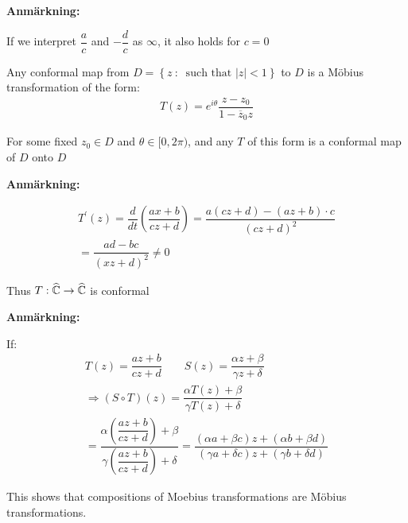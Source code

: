 \par\bigskip
\noindent\textbf{Anmärkning:}\par
\noindent If we interpret $\dfrac{a}{c}$ and $-\dfrac{d}{c}$ as $\infty$, it also holds for $c=0$
\newpage
\begin{theo}[]{}
  Any conformal map from $D = \left\{z\::\:\text{ such that }\left|z\right|<1\right\}$ to $D$ is a Möbius transformation of the form:
  \begin{equation*}
    \begin{gathered}
      T(z) = e^{i\theta}\dfrac{z-z_0}{1-\overline{z}_0z}
    \end{gathered}
  \end{equation*}
  \par\bigskip
  \noindent For some fixed $z_0\in D$ and $\theta\in[0,2\pi)$, and any $T$ of this form is a conformal map of $D$ onto $D$
\end{theo}
\par\bigskip
\noindent\textbf{Anmärkning:}\par
\begin{equation*}
  \begin{gathered}
    T^{\prime}(z) = \dfrac{d}{dt}\left(\dfrac{ax+b}{cz+d}\right) = \dfrac{a(cz+d)-(az+b)\cdot c}{(cz+d)^2}\\
    = \dfrac{ad-bc}{(xz+d)^2}\neq0
  \end{gathered}
\end{equation*}\par
\noindent Thus $T:\widehat{\mathbb{C}}\to\widehat{\mathbb{C}}$ is conformal
\par\bigskip
\noindent\textbf{Anmärkning:}\par
\noindent If:
\begin{equation*}
  \begin{gathered}
    T(z) = \dfrac{az+b}{cz+d}\qquad S(z) = \dfrac{\alpha z+\beta}{\gamma z+\delta}\\
    \Rightarrow (S\circ T)(z) = \dfrac{\alpha T(z)+\beta}{\gamma T(z)+\delta}\\
    = \dfrac{\alpha\left(\dfrac{az+b}{cz+d}\right)+\beta}{\gamma\left(\dfrac{az+b}{cz+d}\right)+\delta} = \dfrac{(\alpha a+\beta c)z+(\alpha b+\beta d)}{(\gamma a+\delta c)z+(\gamma b+\delta d)}
  \end{gathered}
\end{equation*}
\par\bigskip
\noindent This shows that compositions of Moebius transformations are Möbius transformations.
\par\bigskip
